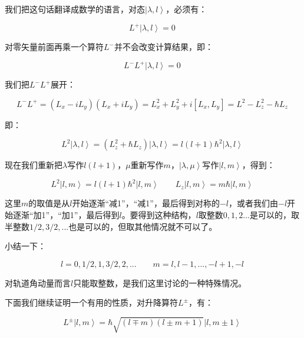 我们把这句话翻译成数学的语言，对态$\left| \lambda, l \right\rangle$，必须有：

\begin{equation}
L^+ \left| \lambda, l \right\rangle = 0~
\end{equation}

对零矢量前面再乘一个算符$L^-$并不会改变计算结果，即：

\begin{equation}
L^- L^+ \left| \lambda, l \right\rangle = 0 ~
\end{equation}

我们把$L^- L^+$展开：

\begin{equation}
L^- L^+ = ( L_x - i L_y ) (L_x + i L_y) = L_x^2 + L_y^2 + i [ L_x, L_y ] 
{} = L^2 - L_z^2 - \hbar L_z~
\end{equation}

即：

\begin{equation}
L^2 \left| \lambda, l \right\rangle = (L_z^2 + \hbar L_z) \left| \lambda, l \right\rangle = l (l + 1)\hbar^2 \left| \lambda, l \right\rangle~
\end{equation}

现在我们重新把$\lambda$写作$l (l +1)$，$\mu$重新写作$m$，$\left|  \lambda, \mu \right\rangle$写作$\left| l, m \right\rangle$，得到：

\begin{equation}
L^2 \left| l,m \right\rangle = l(l+1)\hbar^2 \left| l,m \right\rangle \qquad
L_z \left| l,m \right\rangle = m \hbar \left| l,m \right\rangle~
\end{equation}

这里$m$的取值是从$l$开始逐渐“减1”，“减1”，最后得到对称的$-l$，或者我们由$-l$开始逐渐“加1”，“加1”，最后得到$l$。要得到这种结构，$l$取整数$0, 1, 2 ...$是可以的，取半整数$1/2, 3/2, ...$也是可以的，但取其他情况就不可以了。

小结一下：

\begin{equation}
l = 0, 1/2, 1, 3/2, 2, ... \qquad
m = l, l-1, ..., -l +1 , -l~
\end{equation}

对轨道角动量而言$l$只能取整数，是我们这里讨论的一种特殊情况。

下面我们继续证明一个有用的性质，对升降算符$L^{\pm}$，有：

\begin{equation}
L^{\pm} \left| l,m \right\rangle = \hbar \sqrt{(l \mp m)(l \pm m +1)
} \left|l, m \pm 1 \right\rangle~
\end{equation}

